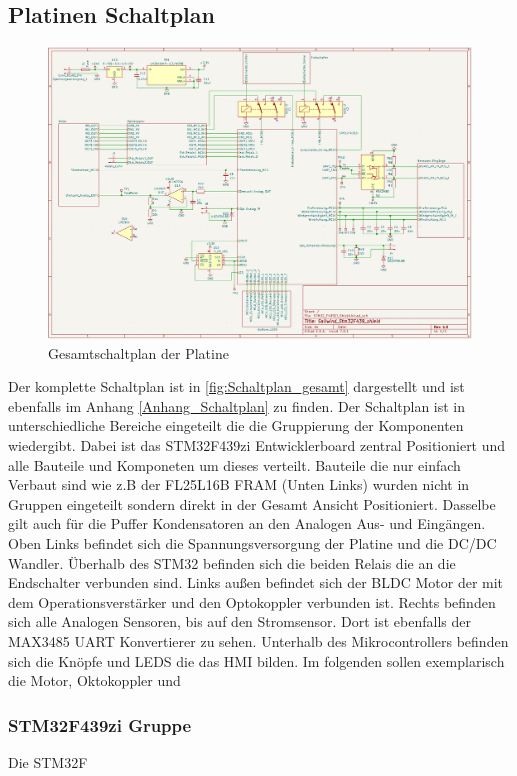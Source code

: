 \subsection{Platinen Schaltplan}
\begin{figure}[H]
	\centering
	\includegraphics[width=1.0\textwidth]{images/Hardware/Schaltplan_Gesamt.PNG}
	\caption{Gesamtschaltplan der Platine}
	\label{fig:Schaltplan_gesamt}
\end{figure}
Der komplette Schaltplan ist in \autoref{fig:Schaltplan_gesamt} dargestellt und ist ebenfalls im Anhang \autoref{Anhang_Schaltplan} zu finden. Der Schaltplan ist in unterschiedliche Bereiche eingeteilt die die Gruppierung der Komponenten wiedergibt. Dabei ist das STM32F439zi Entwicklerboard zentral Positioniert und alle Bauteile und Komponeten um dieses verteilt. Bauteile die nur einfach Verbaut sind wie z.B der FL25L16B \acs{FRAM} (Unten Links) wurden nicht in Gruppen eingeteilt sondern direkt in der Gesamt Ansicht Positioniert. Dasselbe gilt auch für die Puffer Kondensatoren an den Analogen Aus- und Eingängen. Oben Links befindet sich die Spannungsversorgung der Platine und die \acs{DC}/DC Wandler. Überhalb des STM32 befinden sich die beiden Relais die an die Endschalter verbunden sind. Links außen befindet sich der \ac{BLDC} Motor der mit dem Operationsverstärker und den Optokoppler verbunden ist. Rechts befinden sich alle Analogen Sensoren, bis auf den Stromsensor. Dort ist ebenfalls der MAX3485 \acs{UART} Konvertierer zu sehen. Unterhalb des Mikrocontrollers befinden sich die Knöpfe und LEDS die das \acs{HMI} bilden. Im folgenden sollen exemplarisch die Motor, Oktokoppler und 
\subsubsection{STM32F439zi Gruppe}
Die STM32F

